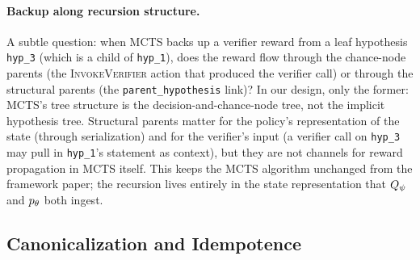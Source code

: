\paragraph{Backup along recursion structure.}
A subtle question: when MCTS backs up a verifier reward from a leaf
hypothesis \texttt{hyp\_3} (which is a child of \texttt{hyp\_1}), does
the reward flow through the chance-node parents (the
\textsc{InvokeVerifier} action that produced the verifier call) or
through the structural parents (the \texttt{parent\_hypothesis} link)?
In our design, only the former: MCTS's tree structure is the
decision-and-chance-node tree, not the implicit hypothesis tree.
Structural parents matter for the policy's representation of the state
(through serialization) and for the verifier's input (a verifier call
on \texttt{hyp\_3} may pull in \texttt{hyp\_1}'s statement as context),
but they are not channels for reward propagation in MCTS itself. This
keeps the MCTS algorithm unchanged from the framework paper; the
recursion lives entirely in the state representation that $Q_{\psi}$
and $p_{\theta}$ both ingest.

\subsection{Canonicalization and Idempotence}
\label{sec:method-canon}

